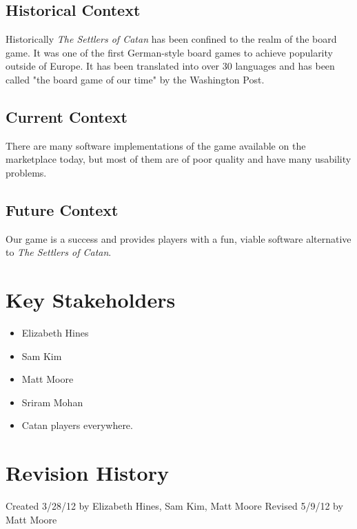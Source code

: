 \documentclass[12pt]{article}
\begin{document}
\subsection{Historical Context}
Historically \emph{The Settlers of Catan} has been confined to the realm of the board game. It was one of the first German-style board games to achieve popularity outside of Europe. It has been translated into over 30 languages and has been called "the board game of our time" by the Washington Post.

\subsection{Current Context}
There are many software implementations of the game available on the marketplace today, but most of them are of poor quality and have many usability problems.

\subsection{Future Context}
Our game is a success and provides players with a fun, viable software alternative to \emph{The Settlers of Catan}.

\section{Key Stakeholders}
\begin{itemize}
\item Elizabeth Hines
\item Sam Kim
\item Matt Moore
\item Sriram Mohan
\item Catan players everywhere.
\end{itemize}
\newpage
\section{Revision History}
Created 3/28/12 by Elizabeth Hines, Sam Kim, Matt Moore
Revised 5/9/12 by Matt Moore
\end{document}
